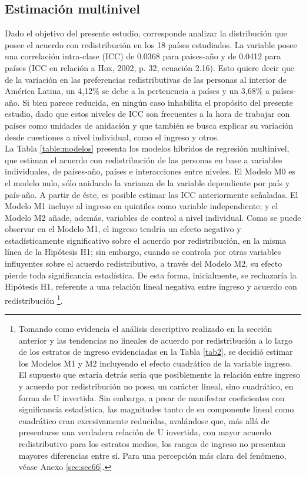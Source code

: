 \documentclass[12pt,letterpaper]{article}
\begin{document}
\subsection{Estimación multinivel \label{sec:sec42}}

Dado el objetivo del presente estudio, corresponde analizar la distribución que posee el acuerdo con redistribución en los 18 países estudiados. La variable posee una correlación intra-clase (ICC) de 0.0368 para paises-año y de 0.0412 para países (ICC en relación a Hox, 2002, p. 32, ecuación 2.16). Esto quiere decir que de la variación en las preferencias redistributivas de las personas al interior de América Latina, un 4,12\% se debe a la pertenencia a países y un 3,68\% a países-año. Si bien parece reducida, en ningún caso inhabilita el propósito del presente estudio, dado que estos niveles de ICC son frecuentes a la hora de trabajar con países como unidades de anidación y que también se busca explicar su variación desde cuestiones a nivel individual, como el ingreso y otros.\\

La Tabla \ref{table:modelos} presenta los modelos híbridos de regresión multinivel, que estiman el acuerdo con redistribución de las personas en base a variables individuales, de países-año, países e interacciones entre niveles. El Modelo M0 es el modelo nulo, sólo anidando la varianza de la variable dependiente por país y país-año. A partir de éste, es posible estimar las ICC anteriormente señaladas. El Modelo M1 incluye al ingreso en quintiles como variable independiente; y el Modelo M2 añade, además, variables de control a nivel individual. Como se puede observar en el Modelo M1, el ingreso tendría un efecto negativo y estadísticamente significativo sobre el acuerdo por redistribución, en la misma línea de la Hipótesis H1; sin embargo, cuando se controla por otras variables influyentes sobre el acuerdo redistributivo, a través del Modelo M2, su efecto pierde toda significancia estadística. De esta forma, inicialmente, se rechazaría la Hipótesis H1, referente a una relación lineal negativa entre ingreso y acuerdo con redistribución \footnote{Tomando como evidencia el análisis descriptivo realizado en la sección anterior y las tendencias no lineales de acuerdo por redistribución a lo largo de los estratos de ingreso evidenciadas en la Tabla \ref{tab2}, se decidió estimar los Modelos M1 y M2 incluyendo el efecto cuadrático de la variable ingreso. El supuesto que estaría detrás sería que posiblemente la relación entre ingreso y acuerdo por redistribución no posea un carácter lineal, sino cuadrático, en forma de U invertida. Sin embargo, a pesar de manifestar coeficientes con significancia estadística, las magnitudes tanto de su componente lineal como cuadrático eran excesivamente reducidas, avalándose que, más allá de presentarse una verdadera relación de U invertida, con mayor acuerdo redistributivo para los estratos medios, los rangos de ingreso no presentan mayores diferencias entre sí. Para una percepción más clara del fenómeno, véase Anexo \ref{sec:sec66}.}.\\
\end{document}
